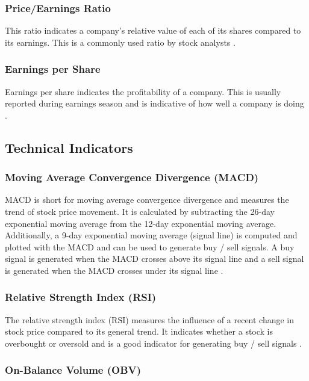 \documentclass[10pt]{article}
\begin{document}
\subsubsection{Price/Earnings Ratio}

This ratio indicates a company's relative value of each of its shares compared to its earnings. This is a commonly used ratio by stock analysts \cite{fadummies:2016}.

\subsubsection{Earnings per Share}

Earnings per share indicates the profitability of a company. This is usually reported during earnings season and is indicative of how well a company is doing \cite{fadummies:2016}.

\subsection{Technical Indicators}

\subsubsection{Moving Average Convergence Divergence (MACD)}

MACD is short for moving average convergence divergence and measures the trend of stock price movement. It is calculated by subtracting the 26-day exponential moving average from the 12-day exponential moving average. Additionally, a 9-day exponential moving average (signal line) is computed and plotted with the MACD and can be used to generate buy / sell signals. A buy signal is generated when the MACD crosses above its signal line and a sell signal is generated when the MACD crosses under its signal line \cite{tadummies:2020, stankovic:2015, li:2019}.

\subsubsection{Relative Strength Index (RSI)}

The relative strength index (RSI) measures the influence of a recent change in stock price compared to its general trend. It indicates whether a stock is overbought or oversold and is a good indicator for generating buy / sell signals \cite{tadummies:2020, stankovic:2015}.

\subsubsection{On-Balance Volume (OBV)}
\end{document}

